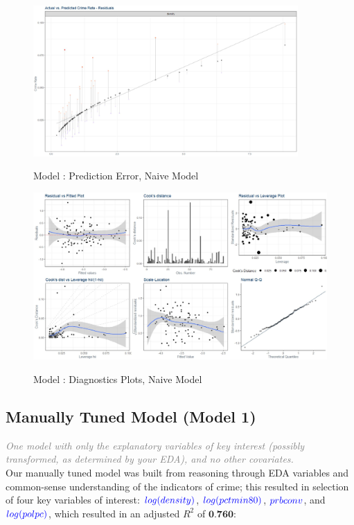 \begin{figure}[!ht]
	\centering
	\includegraphics[width=0.9\textwidth]{images/Model_0_residuals.jpg}
	\label{fig:Model0 Residuals}
	\caption{Model : Prediction Error, Naive Model}
\end{figure}

\begin{figure}[!ht]
	\centering
	\includegraphics[width=1.0\textwidth]{images/Model_0_diagnostic_plots.jpg}
	\label{fig:Model0 Diagnostic Plots}
	\caption{Model : Diagnostics Plots, Naive Model}
\end{figure}

\pagebreak

\subsection{Manually Tuned Model (Model 1)}

\textit{\textcolor{Grey}{One model with only the explanatory variables of key interest (possibly transformed, as determined by your EDA), and no other covariates.}}\\

Our manually tuned model was built from reasoning through EDA variables and common-sense understanding of the indicators of crime; this resulted in selection of four key variables of interest: $\textcolor{Blue}{log(density)}$, $\textcolor{Blue}{log(pctmin80)}$, $\textcolor{Blue}{prbconv}$, and $\textcolor{Blue}{log(polpc)}$, which resulted in an adjusted $R^2$ of $\textbf{0.760}$:\\


